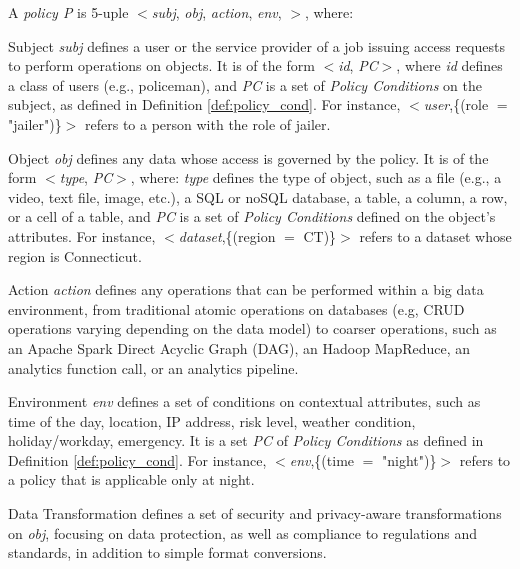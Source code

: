 \begin{definition}[Policy]\label{def:policy_rule}
  A {\it policy P} is 5-uple $<$\textit{subj}, \textit{obj}, \textit{action}, \textit{env}, \textit{\TF}$>$, where:
  \begin{description}
    \item Subject \textit{subj} defines a user or the service provider of a job issuing access requests to perform operations on objects.
          It is of the form $<$\emph{id}, \emph{PC}$>$, where \emph{id} defines a class of users (e.g., policeman), and \emph{PC} is a set of \emph{Policy Conditions} on the subject, as defined in Definition \ref{def:policy_cond}.
          For instance, $<$\emph{user},\{(role $=$ "jailer")\}$>$ refers to a person with the role of jailer.

    \item Object \textit{obj} defines any data whose access is governed by the policy.
          It is of the form $<$\emph{type}, \emph{PC}$>$, where: \emph{type} defines the type of object, such as a file (e.g., a video, text file, image, etc.), a SQL or noSQL database, a table, a column, a row, or a cell of a table, and \emph{PC} is a set of \emph{Policy Conditions} defined on the object's attributes.
          For instance, $<$\emph{dataset},\{(region $=$ CT)\}$>$ refers to a dataset whose region is Connecticut.

    \item Action \textit{action} defines any operations that can be performed within a big data environment, from traditional atomic operations on databases (e.g, CRUD operations varying depending on the data model) to coarser operations, such as an Apache Spark Direct Acyclic Graph (DAG), an Hadoop MapReduce, an analytics function call, or an analytics pipeline.

    \item Environment \textit{env} defines a set of conditions on contextual attributes, such as time of the day, location, IP address, risk level, weather condition, holiday/workday, emergency. It is a set \emph{PC} of
          \emph{Policy Conditions} as defined in Definition \ref{def:policy_cond}.
          For instance, $<$\emph{env},\{(time $=$ "night")\}$>$ refers to a policy that is applicable only at night.

    \item Data Transformation \textit{\TF} defines a set of security and privacy-aware transformations on \textit{obj}, focusing on data protection, as well as compliance to regulations and standards, in addition to simple format conversions.
  \end{description}
\end{definition}

